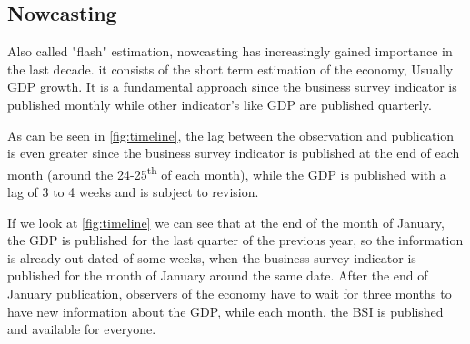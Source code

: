 \documentclass[12pt,a4paper,oneside]{book}
\begin{document}
\subsection{Nowcasting}
\label{sec:nowcasting}

Also called "flash" estimation, nowcasting has increasingly gained importance in the last decade.
it consists of the short term estimation of the economy, Usually GDP growth.
It is a fundamental approach since the business survey indicator is published monthly while other indicator's like GDP are published quarterly.

As can be seen in \autoref{fig:timeline}, 
the lag between the observation and publication is even greater since the business survey indicator is published at the end of each month (around the 24-25\textsuperscript{th} of each month), while the GDP is published with a lag of 3 to 4 weeks and is subject to revision.

If we look at \autoref{fig:timeline} we can see that at the end of the month of January, the GDP is published for the last quarter of the previous year, so the information is already out-dated of some weeks, when the business survey indicator is published for the month of January around the same date. After the end of January publication, observers of the economy have to wait for three months to have new information about the GDP, while each month, the BSI is published and available for everyone.
\end{document}
